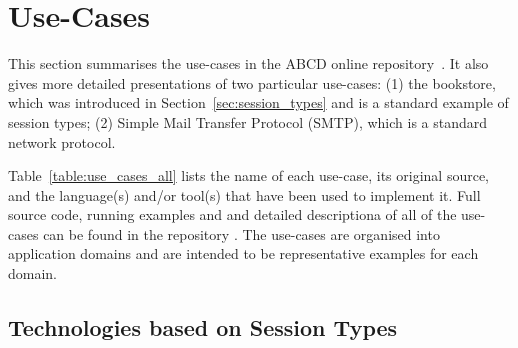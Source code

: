 
\section{Use-Cases}
\label{sec:usecases}

This section summarises the use-cases in
the ABCD online repository~\cite{usecase_repository}. It also gives more detailed presentations of two particular use-cases: (1) the bookstore, which was introduced in Section~\ref{sec:session_types} and is a standard example of session types; (2) Simple Mail Transfer Protocol (SMTP), which is a standard network protocol. 



Table~\ref{table:use_cases_all} lists the name of each use-case, its original source, and the language(s) and/or tool(s) that have been used to implement it. Full source code, 
running examples and and detailed descriptiona of all of the use-cases can be found in the repository \cite{usecase_repository}. 
The use-cases are organised into application domains and are intended to be representative examples for each domain.

\subsection{Technologies based on Session Types}


